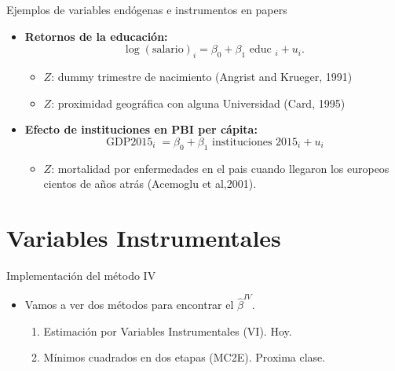 \documentclass[10pt]{beamer}
\begin{document}
\begin{frame}{Ejemplos de variables endógenas e instrumentos en papers}
    \begin{itemize}
        \item \textbf{Retornos de la educación:}
        $$
        \log \left(\text{salario}\right)_{i}=\beta_{0}+\beta_{1} \text { educ }_{i}+u_{i}.
        $$
        \begin{itemize}
            \item $Z$: dummy trimestre de nacimiento (Angrist and Krueger, 1991)
            \item $Z$: proximidad geográfica con alguna Universidad (Card, 1995)
        \end{itemize}

        \item \textbf{Efecto de instituciones en PBI per cápita:}
        $$
        \operatorname{GDP2015}_{i}=\beta_{0}+\beta_{1} \text { instituciones } 2015_{i}+u_{i}
        $$
        \begin{itemize}
            \item $Z$: mortalidad por enfermedades en el pais cuando llegaron los europeos cientos de años atrás (Acemoglu et al,2001).
        \end{itemize}
    \end{itemize}
\end{frame}

\section{Variables Instrumentales}

\begin{frame}{Implementación del método IV}
    \begin{itemize}
        \item Vamos a ver dos métodos para encontrar el $\hat{\beta}^{I V}$.
        \begin{enumerate}
            \item Estimación por Variables Instrumentales (VI). Hoy.
            \item Mínimos cuadrados en dos etapas (MC2E). Proxima clase.
        \end{enumerate}
    \end{itemize}
\end{frame}
\end{document}

